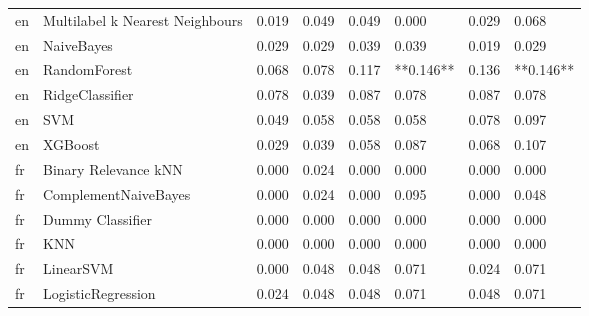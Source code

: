 \begin{tabular}{llllllll}
      en & Multilabel k Nearest Neighbours &     0.019 &                     0.049 &                 0.049 &                  0.000 &                                   0.029 &     0.068 \\
      en &                      NaiveBayes &     0.029 &                     0.029 &                 0.039 &                  0.039 &                                   0.019 &     0.029 \\
      en &                    RandomForest &     0.068 &                     0.078 &                 0.117 &              **0.146** &                                   0.136 & **0.146** \\
      en &                 RidgeClassifier &     0.078 &                     0.039 &                 0.087 &                  0.078 &                                   0.087 &     0.078 \\
      en &                             SVM &     0.049 &                     0.058 &                 0.058 &                  0.058 &                                   0.078 &     0.097 \\
      en &                         XGBoost &     0.029 &                     0.039 &                 0.058 &                  0.087 &                                   0.068 &     0.107 \\
      fr &            Binary Relevance kNN &     0.000 &                     0.024 &                 0.000 &                  0.000 &                                   0.000 &     0.000 \\
      fr &            ComplementNaiveBayes &     0.000 &                     0.024 &                 0.000 &                  0.095 &                                   0.000 &     0.048 \\
      fr &                Dummy Classifier &     0.000 &                     0.000 &                 0.000 &                  0.000 &                                   0.000 &     0.000 \\
      fr &                             KNN &     0.000 &                     0.000 &                 0.000 &                  0.000 &                                   0.000 &     0.000 \\
      fr &                       LinearSVM &     0.000 &                     0.048 &                 0.048 &                  0.071 &                                   0.024 &     0.071 \\
      fr &              LogisticRegression &     0.024 &                     0.048 &                 0.048 &                  0.071 &                                   0.048 &     0.071 \\

\end{tabular}
